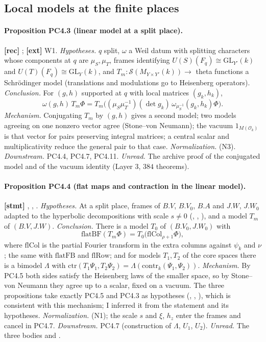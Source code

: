 \documentclass[11pt]{article}
\newcommand{\GL}{\mathrm{GL}}
\newcommand{\Sch}{\mathcal S}
\begin{document}
\subsection{Local models at the finite places}

\paragraph{Proposition PC4.3 (linear model at a split place).} \textbf{[rec]} ; \textbf{[ext]} W1.
\emph{Hypotheses.} $q$ split, $\omega$ a Weil datum with splitting characters whose components at $q$ are $\mu_S,\mu_T$, frames identifying $U(S)(F_q)\cong\GL_{Y'}(k)$ and $U(T)(F_q)\cong\GL_Y(k)$, and $T_m:\Sch(M_{Y\times Y'}(k))\to$ theta functions a Schr\"odinger model (translations and modulations go to Heisenberg operators). \emph{Conclusion.} For $(g,h)$ supported at $q$ with local matrices $(g_k,h_k)$,
\[
\omega(g,h)\,T_m\Phi=T_m\bigl((\mu_S\mu_T^{-1})(\det g_k)\,\omega_{\mu_S^{-1}}(g_k,h_k)\Phi\bigr).
\]
\emph{Mechanism.} Conjugating $T_m$ by $(g,h)$ gives a second model; two models agreeing on one nonzero vector agree (Stone--von Neumann); the vacuum $1_{M(\mathcal O_k)}$ is that vector for pairs preserving integral matrices; a central scalar and multiplicativity reduce the general pair to that case. \emph{Normalization.} (N3). \emph{Downstream.} PC4.4, PC4.7, PC4.11. \emph{Unread.} The archive proof of the conjugated model and of the vacuum identity (Layer 3, $384$ theorems).

\paragraph{Proposition PC4.4 (flat maps and contraction in the linear model).} \textbf{[stmt]} , , .
\emph{Hypotheses.} At a split place, frames of $B.V$, $B.V_0$, $B.A$ and $J.W$, $J.W_0$ adapted to the hyperbolic decompositions with scale $s\neq0$ (, , ), and a model $T_m$ of $(B.V,J.W)$. \emph{Conclusion.} There is a model $T_0$ of $(B.V_0,J.W_0)$ with
\[
\mathrm{flatBF}(T_m\Phi)=T_0\bigl(\mathrm{flCol}_{\rho+1}\Phi\bigr),
\]
where $\mathrm{flCol}$ is the partial Fourier transform in the extra columns against $\psi_k$ and $\nu$; the same with $\mathrm{flatFB}$ and $\mathrm{flRow}$; and for models $T_1,T_2$ of the core spaces there is a bimodel $\Lambda$ with $\mathrm{ctr}(T_1\Psi_1,T_2\Psi_2)=\Lambda(\mathrm{contr}_k(\Psi_1,\Psi_2))$. \emph{Mechanism.} By PC4.5 both sides satisfy the Heisenberg laws of the smaller space, so by Stone--von Neumann they agree up to a scalar, fixed on a vacuum. The three propositions take exactly PC4.5 and PC4.3 as hypotheses (, , ), which is consistent with this mechanism; I inferred it from the statement and its hypotheses. \emph{Normalization.} (N1); the scale $s$ and $\xi$, $h_z$ enter the frames and cancel in PC4.7. \emph{Downstream.} PC4.7 (construction of $\Lambda$, $U_1$, $U_2$). \emph{Unread.} The three bodies and .
\end{document}
